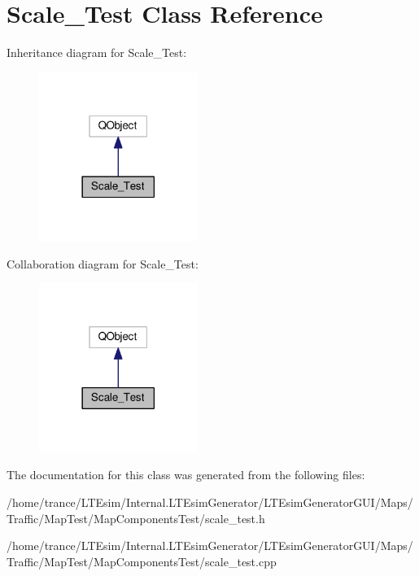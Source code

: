\hypertarget{class_scale___test}{}\section{Scale\+\_\+\+Test Class Reference}
\label{class_scale___test}


Inheritance diagram for Scale\+\_\+\+Test\+:
\nopagebreak
\begin{figure}[H]
\begin{center}
\leavevmode
\includegraphics[width=146pt]{class_scale___test__inherit__graph}
\end{center}
\end{figure}


Collaboration diagram for Scale\+\_\+\+Test\+:
\nopagebreak
\begin{figure}[H]
\begin{center}
\leavevmode
\includegraphics[width=146pt]{class_scale___test__coll__graph}
\end{center}
\end{figure}


The documentation for this class was generated from the following files\+:\begin{DoxyCompactItemize}
\item 
/home/trance/\+L\+T\+Esim/\+Internal.\+L\+T\+Esim\+Generator/\+L\+T\+Esim\+Generator\+G\+U\+I/\+Maps/\+Traffic/\+Map\+Test/\+Map\+Components\+Test/scale\+\_\+test.\+h\item 
/home/trance/\+L\+T\+Esim/\+Internal.\+L\+T\+Esim\+Generator/\+L\+T\+Esim\+Generator\+G\+U\+I/\+Maps/\+Traffic/\+Map\+Test/\+Map\+Components\+Test/scale\+\_\+test.\+cpp\end{DoxyCompactItemize}
